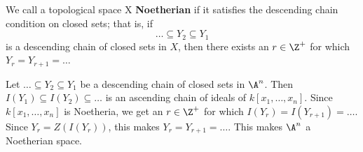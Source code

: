 \begin{definition}
    We call a topological space X \textbf{Noetherian} if it satisfies
    the descending chain condition on closed sets; that is, if
    \begin{equation*}
        \dots \subseteq Y_2 \subseteq Y_1
    \end{equation*}
    is a descending chain of closed sets in $X$, then there exists an  $r \in
    \Z^+$ for which  $Y_r=Y_{r+1}=\dots$
\end{definition}

\begin{example}\label{example_1.6}
    Let $\dots \subseteq Y_2 \subseteq Y_1$ be a descending chain of closed sets
    in $\A^n$. Then  $I(Y_1) \subseteq I(Y_2) \subseteq \dots$ is an ascending
    chain of ideals of $k[x_1, \dots, x_n]$. Since $k[x_1, \dots, x_n]$ is
    Noetheria, we get an $r \in \Z^+$ for which  $I(Y_r)=I(Y_{r+1})=\dots$.
    Since $Y_r=Z(I(Y_r))$, this makes $Y_r=Y_{r+1}=\dots$. This makes $\A^n$ a
    Noetherian space.
\end{example}

